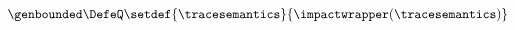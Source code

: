 \begin{eqnarray*}
  \genbounded\DefeQ
  \setdef{\tracesemantics}{\impactwrapper(\tracesemantics)}
\end{eqnarray*}
